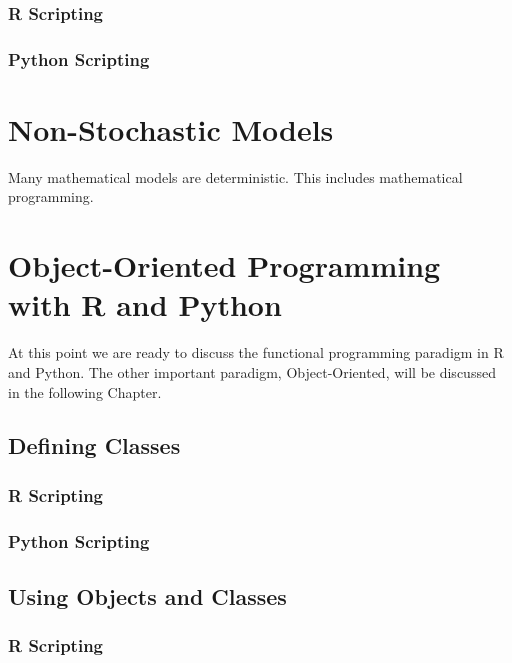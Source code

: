 \documentclass[]{book}
\theoremstyle{definition}
\theoremstyle{definition}
\theoremstyle{definition}
\theoremstyle{remark}
\begin{document}
\subsection{R Scripting}\label{r-scripting-11}

\subsection{Python Scripting}\label{python-scripting-11}

\chapter{Non-Stochastic Models}\label{non-stochastic-models}

Many mathematical models are deterministic. This includes mathematical
programming.

\chapter{Object-Oriented Programming with R and
Python}\label{object-oriented-programming-with-r-and-python}

At this point we are ready to discuss the functional programming
paradigm in R and Python. The other important paradigm, Object-Oriented,
will be discussed in the following Chapter.

\section{Defining Classes}\label{defining-classes}

\subsection{R Scripting}\label{r-scripting-12}

\subsection{Python Scripting}\label{python-scripting-12}

\section{Using Objects and Classes}\label{using-objects-and-classes}

\subsection{R Scripting}\label{r-scripting-13}
\end{document}
